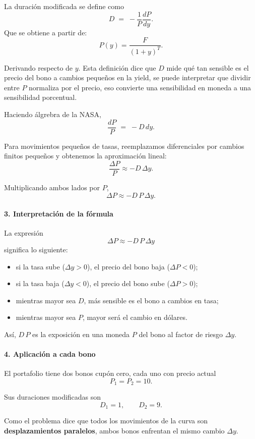 La duración modificada se define como
\[
D \;=\; -\frac{1}{P}\frac{dP}{dy}.
\]
Que se obtiene a partir de:
\[
P(y)=\frac{F}{(1+y)^T}.
\]

Derivando respecto de \(y\). Esta definición dice que \(D\) mide qué tan sensible es el precio del bono a cambios
pequeños en la yield, se puede interpretar que dividir entre \(P\) normaliza por el precio, eso convierte una sensibilidad en moneda a una sensibilidad porcentual. 

Haciendo álgrebra de la NASA,
\[
\frac{dP}{P} \;=\; -D\,dy.
\]

Para movimientos pequeños de tasas, reemplazamos diferenciales por cambios finitos
pequeños y obtenemos la aproximación lineal:
\[
\frac{\Delta P}{P}\approx -D\,\Delta y.
\]

Multiplicando ambos lados por \(P\),
\[
\Delta P \approx -D\,P\,\Delta y.
\]

\paragraph{3. Interpretación de la fórmula}

La expresión
\[
\Delta P \approx -D\,P\,\Delta y
\]
significa lo siguiente:

\begin{itemize}
    \item si la tasa sube (\(\Delta y>0\)), el precio del bono baja (\(\Delta P<0\));
    \item si la tasa baja (\(\Delta y<0\)), el precio del bono sube (\(\Delta P>0\));
    \item mientras mayor sea \(D\), más sensible es el bono a cambios en tasa;
    \item mientras mayor sea \(P\), mayor será el cambio en dólares.
\end{itemize}

Así, \(D\,P\) es la exposición en una moneda \(P\) del bono al factor de riesgo
\(\Delta y\).

\paragraph{4. Aplicación a cada bono}

El portafolio tiene dos bonos cupón cero, cada uno con precio actual
\[
P_1=P_2=10.
\]

Sus duraciones modificadas son
\[
D_1=1,
\qquad
D_2=9.
\]

Como el problema dice que todos los movimientos de la curva son
\textbf{desplazamientos paralelos}, ambos bonos enfrentan el mismo cambio
\(\Delta y\).

